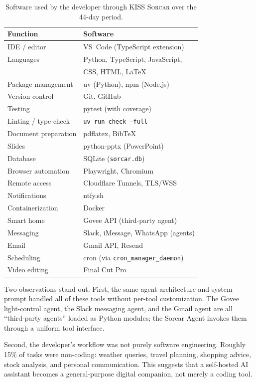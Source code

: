 \documentclass{article}
\newcommand{\kisssys}{\textsc{KISS Sorcar}}
\begin{document}
\begin{table}[t]
\centering
\caption{Software used by the developer through \kisssys{}
over the 44-day period.}
\label{tab:software}
\begin{tabular}{ll}
\toprule
\textbf{Function} & \textbf{Software} \\
\midrule
IDE / editor          & VS~Code (TypeScript extension) \\
Languages             & Python, TypeScript, JavaScript, \\
                      & CSS, HTML, \LaTeX{} \\
Package management    & uv (Python), npm (Node.js) \\
Version control       & Git, GitHub \\
Testing               & pytest (with coverage) \\
Linting / type-check  & \texttt{uv run check --full} \\
Document preparation  & pdflatex, BibTeX \\
Slides                & python-pptx (PowerPoint) \\
Database              & SQLite (\texttt{sorcar.db}) \\
Browser automation    & Playwright, Chromium \\
Remote access         & Cloudflare Tunnels, TLS/WSS \\
Notifications         & ntfy.sh \\
Containerization      & Docker \\
Smart home            & Govee API (third-party agent) \\
Messaging             & Slack, iMessage, WhatsApp (agents) \\
Email                 & Gmail API, Resend \\
Scheduling            & cron (via \texttt{cron\_manager\_daemon}) \\
Video editing         & Final Cut Pro \\
\bottomrule
\end{tabular}
\end{table}

Two observations stand out.
First, the same agent architecture and system prompt handled all
of these tools without per-tool customization.
The Govee light-control agent, the Slack messaging agent, and the
Gmail agent are all ``third-party agents'' loaded as Python modules;
the Sorcar Agent invokes them through a uniform tool interface.

Second, the developer's workflow was not purely software engineering.
Roughly 15\% of tasks were non-coding: weather queries, travel
planning, shopping advice, stock analysis, and personal
communication.
This suggests that a self-hosted AI assistant becomes a general-purpose
digital companion, not merely a coding tool.
\end{document}

